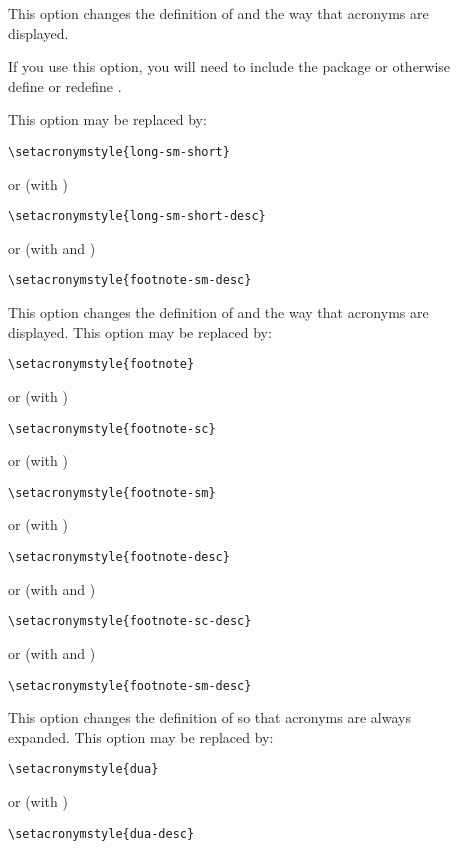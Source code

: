 \documentclass[report,inlinetitle]{nlctdoc}
\begin{document}
\begin{description}
\item[] This option changes the definition of
 and the way that acronyms are displayed.
\begin{important}
If you use this option, you will need to include the 
package or otherwise define  or redefine
.
\end{important}
This option may be replaced by:
\begin{verbatim}
\setacronymstyle{long-sm-short}
\end{verbatim}
or (with )
\begin{verbatim}
\setacronymstyle{long-sm-short-desc}
\end{verbatim}
or (with  and )
\begin{verbatim}
\setacronymstyle{footnote-sm-desc}
\end{verbatim}

\item[] This option changes the definition of
 and the way that acronyms are displayed.
This option may be replaced by:
\begin{verbatim}
\setacronymstyle{footnote}
\end{verbatim}
or (with )
\begin{verbatim}
\setacronymstyle{footnote-sc}
\end{verbatim}
or (with )
\begin{verbatim}
\setacronymstyle{footnote-sm}
\end{verbatim}
or (with )
\begin{verbatim}
\setacronymstyle{footnote-desc}
\end{verbatim}
or (with  and )
\begin{verbatim}
\setacronymstyle{footnote-sc-desc}
\end{verbatim}
or (with  and )
\begin{verbatim}
\setacronymstyle{footnote-sm-desc}
\end{verbatim}


\item[] This option changes the definition of
 so that acronyms are always expanded. 
This option may be replaced by:
\begin{verbatim}
\setacronymstyle{dua}
\end{verbatim}
or (with )
\begin{verbatim}
\setacronymstyle{dua-desc}
\end{verbatim}

\end{description}
\end{document}
